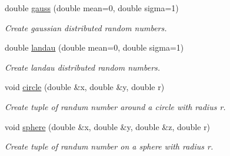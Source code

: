 \begin{DoxyCompactItemize}
double \hyperlink{class_d_d4hep_1_1_simulation_1_1_geant4_random_a759d26cbc394bdbd9d34196c33b7419e}{gauss} (double mean=0, double sigma=1)
\begin{DoxyCompactList}\small\item\em Create gaussian distributed random numbers. \item\end{DoxyCompactList}\item 
double \hyperlink{class_d_d4hep_1_1_simulation_1_1_geant4_random_a44860eb96afcbda002a7845e8319eb4f}{landau} (double mean=0, double sigma=1)
\begin{DoxyCompactList}\small\item\em Create landau distributed random numbers. \item\end{DoxyCompactList}\item 
void \hyperlink{class_d_d4hep_1_1_simulation_1_1_geant4_random_a1319236bb57ff830f1d575dbe928cb01}{circle} (double \&x, double \&y, double r)
\begin{DoxyCompactList}\small\item\em Create tuple of randum number around a circle with radius r. \item\end{DoxyCompactList}\item 
void \hyperlink{class_d_d4hep_1_1_simulation_1_1_geant4_random_af0825e540ad54e3510b4e5a1450a3211}{sphere} (double \&x, double \&y, double \&z, double r)
\begin{DoxyCompactList}\small\item\em Create tuple of randum number on a sphere with radius r. \item\end{DoxyCompactList}\end{DoxyCompactItemize}
